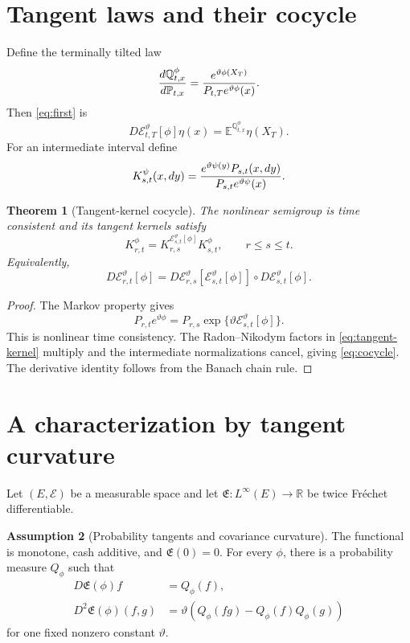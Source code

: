 \documentclass[11pt,reqno]{amsart}
\newtheorem{theorem}{Theorem}[section]
\theoremstyle{definition}
\newtheorem{assumption}[theorem]{Assumption}
\theoremstyle{remark}
\newcommand{\E}{\mathbb E}
\newcommand{\Pp}{\mathbb P}
\newcommand{\Qp}{\mathbb Q}
\newcommand{\R}{\mathbb R}
\newcommand{\cE}{\mathcal E}
\begin{document}
\section{Tangent laws and their cocycle}

Define the terminally tilted law
\begin{equation}\label{eq:tilted-law}
 {d\Qp_{t,x}^{\phi}\over d\Pp_{t,x}}
 ={e^{\vartheta\phi(X_T)}
 \over P_{t,T}e^{\vartheta\phi}(x)}.
\end{equation}
Then \eqref{eq:first} is
\begin{equation}\label{eq:tangent-expectation}
 D\cE_{t,T}^{\vartheta}[\phi]\eta(x)
 =\E^{\Qp_{t,x}^{\phi}}\eta(X_T).
\end{equation}
For an intermediate interval define
\begin{equation}\label{eq:tangent-kernel}
 K_{s,t}^{\psi}(x,dy)=
 {e^{\vartheta\psi(y)}P_{s,t}(x,dy)
 \over P_{s,t}e^{\vartheta\psi}(x)}.
\end{equation}

\begin{theorem}[Tangent-kernel cocycle]\label{thm:cocycle}
The nonlinear semigroup is time consistent and its tangent kernels satisfy
\begin{equation}\label{eq:cocycle}
 K_{r,t}^{\phi}
 =K_{r,s}^{\cE_{s,t}^{\vartheta}[\phi]}
  K_{s,t}^{\phi},
 \qquad r\le s\le t.
\end{equation}
Equivalently,
\[
 D\cE_{r,t}^{\vartheta}[\phi]
 =D\cE_{r,s}^{\vartheta}
   [\cE_{s,t}^{\vartheta}[\phi]]
 \circ D\cE_{s,t}^{\vartheta}[\phi].
\]
\end{theorem}

\begin{proof}
The Markov property gives
\[
 P_{r,t}e^{\vartheta\phi}
 =P_{r,s}\exp\{\vartheta\cE_{s,t}^{\vartheta}[\phi]\}.
\]
This is nonlinear time consistency.  The Radon--Nikodym factors in
\eqref{eq:tangent-kernel} multiply and the intermediate normalizations cancel,
giving \eqref{eq:cocycle}.  The derivative identity follows from the Banach
chain rule.
\end{proof}

\section{A characterization by tangent curvature}

Let $(E,\mathcal E)$ be a measurable space and let
$\mathfrak E:L^\infty(E)\to\R$ be twice Fr\'echet differentiable.

\begin{assumption}[Probability tangents and covariance curvature]\label{ass:curvature}
The functional is monotone, cash additive, and $\mathfrak E(0)=0$.  For every
$\phi$, there is a probability measure $Q_\phi$ such that
\begin{align}
 D\mathfrak E(\phi)f&=Q_\phi(f),\label{eq:tangent-prob}\\
 D^2\mathfrak E(\phi)(f,g)
 &=\vartheta\left(Q_\phi(fg)-Q_\phi(f)Q_\phi(g)\right)
 \label{eq:cov-curvature}
\end{align}
for one fixed nonzero constant $\vartheta$.
\end{assumption}
\end{document}
